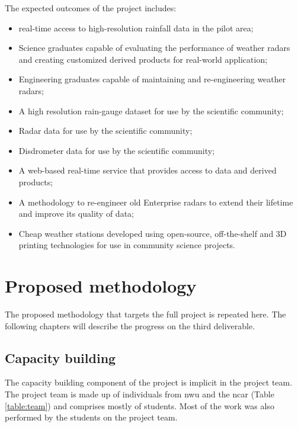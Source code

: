\documentclass{wrcreport}
\begin{document}
The expected outcomes of the project includes:
\begin{itemize}
\item real-time access to high-resolution rainfall data in the pilot area;
\item Science graduates capable of evaluating the performance of weather radars and creating customized derived products for real-world application;
\item Engineering graduates capable of maintaining and re-engineering weather radars;
\item A high resolution rain-gauge dataset for use by the scientific community;
\item Radar data for use by the scientific community;
\item Disdrometer data for use by the scientific community;
\item A web-based real-time service that provides access to data and derived products;
\item A methodology to re-engineer old Enterprise radars to extend their lifetime and improve its quality of data;
\item Cheap weather stations developed using open-source, off-the-shelf and 3D printing technologies for use in community science projects.
\end{itemize}

\chapter{Proposed methodology}
\label{chap:meth}

The proposed methodology that targets the full project is repeated
here. The following chapters will describe the progress on the third
deliverable.

\section{Capacity building}

The capacity building component of the project is implicit in the
project team. The project team is made up of individuals from
\gls{nwu} and the \gls{ncar} (Table \ref{table:team}) and comprises mostly of
 students. Most of the work was also performed by the students on the project team.
\end{document}
